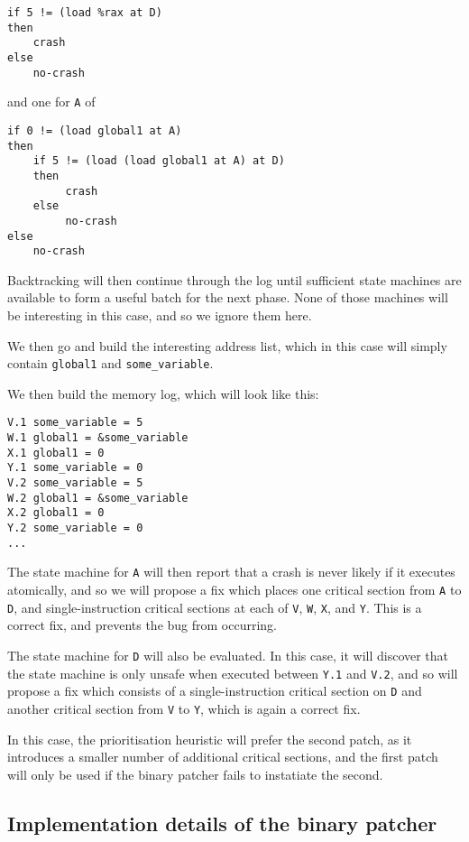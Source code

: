 \documentclass[10pt,twocolumn,preprint,natbib,authoryear]{sigplanconf}
\begin{document}
\begin{verbatim}
if 5 != (load %rax at D)
then
    crash
else
    no-crash
\end{verbatim}

and one for \verb|A| of

\begin{verbatim}
if 0 != (load global1 at A)
then
    if 5 != (load (load global1 at A) at D)
    then
         crash
    else
         no-crash
else
    no-crash
\end{verbatim}

Backtracking will then continue through the log until sufficient state
machines are available to form a useful batch for the next phase.
None of those machines will be interesting in this case, and so we
ignore them here.

We then go and build the interesting address list, which in this case
will simply contain \verb|global1| and \verb|some_variable|.

We then build the memory log, which will look like this:

\begin{verbatim}
V.1 some_variable = 5
W.1 global1 = &some_variable
X.1 global1 = 0
Y.1 some_variable = 0
V.2 some_variable = 5
W.2 global1 = &some_variable
X.2 global1 = 0
Y.2 some_variable = 0
...
\end{verbatim}

The state machine for \verb|A| will then report that a crash is never
likely if it executes atomically, and so we will propose a fix which
places one critical section from \verb|A| to \verb|D|, and
single-instruction critical sections at each of \verb|V|, \verb|W|,
\verb|X|, and \verb|Y|.  This is a correct fix, and prevents the bug
from occurring.

The state machine for \verb|D| will also be evaluated.  In this case,
it will discover that the state machine is only unsafe when executed
between \verb|Y.1| and \verb|V.2|, and so will propose a fix which
consists of a single-instruction critical section on \verb|D| and
another critical section from \verb|V| to \verb|Y|, which is again a
correct fix.

In this case, the prioritisation heuristic will prefer the second
patch, as it introduces a smaller number of additional critical
sections, and the first patch will only be used if the binary patcher
fails to instatiate the second.


\subsection{Implementation details of the binary patcher}
\label{sect:binpatch}
\end{document}
